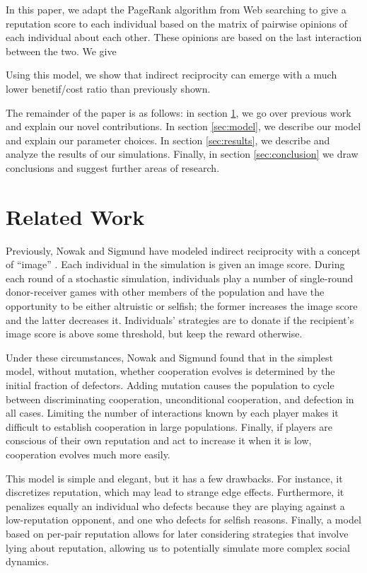 \documentclass{amsart}
\begin{document}
In this paper, we adapt the PageRank algorithm from Web searching to give a reputation score to each individual based on the matrix of pairwise opinions of each individual about each other. These opinions are based on the last interaction between the two. We give %

Using this model, we show that indirect reciprocity can emerge with a much lower benetif/cost ratio than previously shown. %

The remainder of the paper is as follows: in section \ref{sec:related}, we go over previous work and explain our novel contributions. In section \ref{sec:model}, we describe our model and explain our parameter choices. In section \ref{sec:results}, we describe and analyze the results of our simulations. Finally, in section \ref{sec:conclusion} we draw conclusions and suggest further areas of research.

\section{Related Work}\label{sec:related}

Previously, Nowak and Sigmund have modeled indirect reciprocity with a
concept of ``image'' \cite{nowak_evolution_1998}. Each individual in
the simulation is given an image score. During each round of a
stochastic simulation, individuals play a number of single-round
donor-receiver games with other members of the population and have the
opportunity to be either altruistic or selfish; the former increases
the image score and the latter decreases it. Individuals’ strategies
are to donate if the recipient’s image score is above some threshold,
but keep the reward otherwise.

Under these circumstances, Nowak and Sigmund found that in the
simplest model, without mutation, whether cooperation evolves is
determined by the initial fraction of defectors. Adding mutation
causes the population to cycle between discriminating cooperation,
unconditional cooperation, and defection in all cases. Limiting the
number of interactions known by each player makes it difficult to
establish cooperation in large populations. Finally, if players are
conscious of their own reputation and act to increase it when it is
low, cooperation evolves much more easily.

This model is simple and elegant, but it has a few drawbacks. For
instance, it discretizes reputation, which may lead to strange edge
effects. Furthermore, it penalizes equally an individual who defects
because they are playing against a low-reputation opponent, and one
who defects for selfish reasons. Finally, a model based on per-pair
reputation allows for later considering strategies that involve lying
about reputation, allowing us to potentially simulate more complex
social dynamics.
\end{document}
